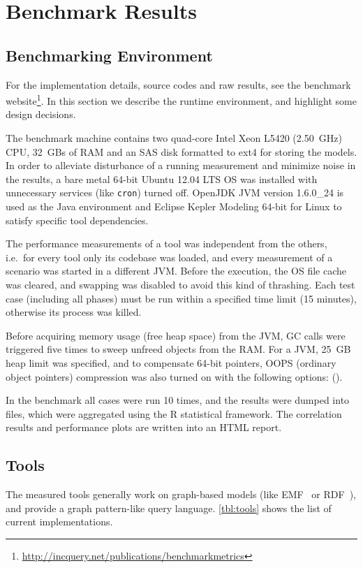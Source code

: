 \chapter{Benchmark Results}


\section{Benchmarking Environment}
\label{sec:environment}

For the implementation details, source codes and raw results, see the benchmark website\footnote{\url{http://incquery.net/publications/benchmarkmetrics}}. In this section we describe the runtime environment, and highlight some design decisions.

The benchmark machine contains two quad-core Intel Xeon L5420 (2.50~GHz) CPU, 32~GBs of RAM and an SAS disk formatted to ext4 for storing the models. In order to alleviate disturbance of a running measurement and minimize noise in the results, a bare metal 64-bit Ubuntu 12.04 LTS OS was installed with unnecessary services (like \texttt{cron}) turned off. OpenJDK JVM version 1.6.0\_24 is used as the Java environment and Eclipse Kepler Modeling 64-bit for Linux to satisfy specific tool dependencies.

The performance measurements of a tool was independent from the others, i.e.\ for every tool only its codebase was loaded, and every measurement of a scenario was started in a different JVM. Before the execution, the OS file cache was cleared, and swapping was disabled to avoid this kind of thrashing. Each test case (including all phases) must be run within a specified time limit (15 minutes), otherwise its process was killed.

Before acquiring memory usage (free heap space) from the JVM, GC calls were triggered five times to sweep unfreed objects from the RAM. For a JVM, 25~GB heap limit was specified, and to compensate 64-bit pointers, OOPS (ordinary object pointers) compression was also turned on with the following options: ().

In the benchmark all cases were run 10 times, and the results were dumped into files, which were aggregated using the R statistical framework. The correlation results and performance plots are written into an HTML report.


\section{Tools}
\label{tools}
The measured tools generally work on graph-based models (like EMF~\cite{EMF} or RDF~\cite{RDF}), and provide a graph pattern-like query language. \autoref{tbl:tools} shows the list of current implementations.

